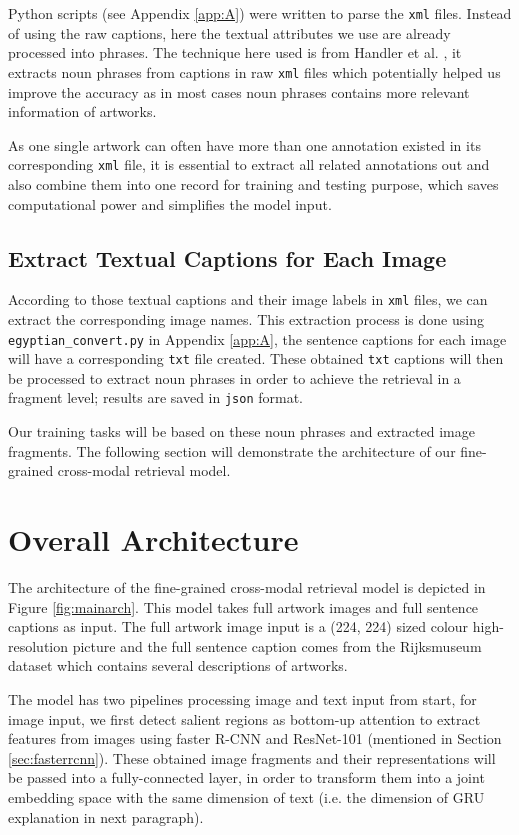 Python scripts (see Appendix \ref{app:A}) were written to parse the \verb|xml| files. Instead of using the raw captions, here the textual attributes we use are already processed into phrases. The technique here used is from Handler et al. \cite{nounphrase}, it extracts noun phrases from captions in raw \verb|xml| files which potentially helped us improve the accuracy as in most cases noun phrases contains more relevant information of artworks.  

As one single artwork can often have more than one annotation existed in its corresponding \verb|xml| file, it is essential to extract all related annotations out and also combine them into one record for training and testing purpose, which saves computational power and simplifies the model input. 

\subsection{Extract Textual Captions for Each Image}

According to those textual captions and their image labels in \verb|xml| files, we can extract the corresponding image names. This extraction process is done using \verb|egyptian_convert.py| in Appendix \ref{app:A}, the sentence captions for each image will have a corresponding \verb|txt| file created. These obtained \verb|txt| captions will then be processed to extract noun phrases in order to achieve the retrieval in a fragment level; results are saved in \verb|json| format. 

Our training tasks will be based on these noun phrases and extracted image fragments. The following section will demonstrate the architecture of our fine-grained cross-modal retrieval model.

\section{Overall Architecture}

The architecture of the fine-grained cross-modal retrieval model is depicted in Figure \ref{fig:mainarch}. This model takes full artwork images and full sentence captions as input. The full artwork image input is a (224, 224) sized colour high-resolution picture and the full sentence caption comes from the Rijksmuseum dataset \cite{MensinkICMIR2014} which contains several descriptions of artworks.

The model has two pipelines processing image and text input from start, for image input, we first detect salient regions as bottom-up attention \cite{bottomup} to extract features from images using faster R-CNN \cite{fasterrcnn} and ResNet-101 \cite{resnet} (mentioned in Section \ref{sec:fasterrcnn}). These obtained image fragments and their representations will be passed into a fully-connected layer, in order to transform them into a joint embedding space with the same dimension of text (i.e. the dimension of GRU explanation in next paragraph).

